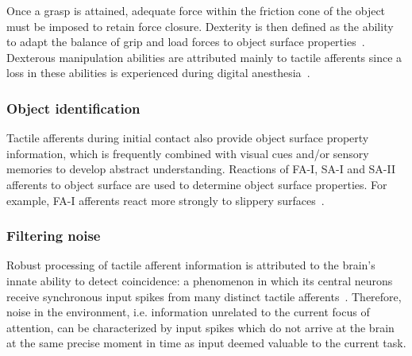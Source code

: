 Once a grasp is attained, adequate force within the friction cone of the object must be imposed to retain force closure.
Dexterity is then defined as the ability to adapt the balance of grip and load forces to object surface properties~\cite{howe1993tactile}.
Dexterous manipulation abilities are attributed mainly to tactile afferents since a loss in these abilities is experienced during digital anesthesia~\cite{Johansson1984}.

\subsubsection*{Object identification}

Tactile afferents during initial contact also provide object surface property information, which is frequently combined with visual cues and/or sensory memories to develop abstract understanding.
Reactions of FA-I, SA-I and SA-II afferents to object surface are used to determine object surface properties.
For example, FA-I afferents react more strongly to slippery surfaces~\cite{burstedt1997coordination}.

\subsubsection*{Filtering noise}

Robust processing of tactile afferent information is attributed to the brain's innate ability to detect coincidence: a phenomenon in which its central neurons receive synchronous input spikes from many distinct tactile afferents~\cite{hopfield1995pattern}.
Therefore, noise in the environment, i.e. information unrelated to the current focus of attention, can be characterized by input spikes which do not arrive at the brain at the same precise moment in time as input deemed valuable to the current task.





%


